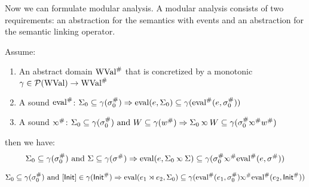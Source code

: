 Now we can formulate modular analysis.
A modular analysis consists of two requirements: an abstraction for the semantics with events and an abstraction for the semantic linking operator.
\begin{thm}
	Assume:
	\begin{enumerate}
		\item An abstract domain ${\text{WVal}}^{\#}$ that is concretized by a monotonic $\gamma\in\mathcal{P}(\text{WVal})\rightarrow{\text{WVal}}^{\#}$
		\item A sound ${\text{eval}}^{\#}$: $\Sigma_0\subseteq\gamma({\sigma}^{\#}_0)\Rightarrow\text{eval}(e,\Sigma_0)\subseteq\gamma({\text{eval}}^{\#}(e,{\sigma}^{\#}_0))$
		\item A sound $\Abs\semlink$: $\Sigma_0\subseteq\gamma(\Abs\ctx_0)\text{ and }W\subseteq\gamma(\Abs{w})\Rightarrow\Sigma_0\semlink W\subseteq\gamma(\Abs\ctx_0\Abs\semlink\Abs{w})$
	\end{enumerate}
	then we have:
	\[\Sigma_0\subseteq\gamma(\Abs\ctx_0)\text{ and }\Sigma\subseteq\gamma(\Abs\ctx)\Rightarrow\eval(e,\Sigma_0\semlink\Sigma)\subseteq\gamma(\Abs\ctx_0\Abs\semlink\Abs\eval(e,\Abs\ctx))\]
\end{thm}
\begin{cor}
	\[\Sigma_0\subseteq\gamma(\Abs\ctx_0)\text{ and }[\InitE]\in\gamma(\Abs\InitE)\Rightarrow\eval(e_1\synlink e_2,\Sigma_0)\subseteq\gamma(\Abs\eval(e_1,\Abs\ctx_0)\Abs\semlink\Abs\eval(e_2,\Abs\InitE))\]
\end{cor}
